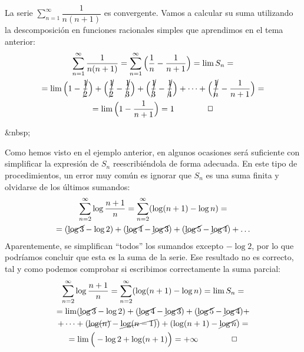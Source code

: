 \begin{ejemplo}\label{ej:telesc}
La serie $\displaystyle\sum_{n=1}^\infty   \dfrac1{n(n+1)}$ es convergente. Vamos a calcular su suma utilizando la descomposición en funciones racionales simples que aprendimos en el tema anterior:
\begin{multline*}
\displaystyle\sum_{n=1}^\infty   \dfrac1{n(n+1)} = \displaystyle\sum_{n=1}^\infty   \Big(\dfrac1n-\dfrac1{n+1}\Big) = \lim S_n = \\
= \lim
\Big(1-\cancel{\frac12}\Big) +
\Big(\cancel{\frac12}-\cancel{\frac13}\Big) +
\Big(\cancel{\frac13}-\cancel{\frac14}\Big) +
\dots + \Big(\cancel{\frac1n}-\frac1{n+1}\Big) =\\
= \lim\Big(1 -\frac1{n+1}\Big) = 1\tag*{\fej}
\end{multline*}
\end{ejemplo}
\begin{rawhtml}
&nbsp;
\end{rawhtml}
\begin{ejemplo}\label{ej:telesc2}
Como hemos visto en el ejemplo anterior, en algunos ocasiones será suficiente con simplificar la expresión de $S_n$ reescribiéndola de forma adecuada.
En este tipo de procedimientos, un error muy común es ignorar que $S_n$ es una suma finita y olvidarse de los últimos sumandos:
\begin{multline*}
\displaystyle\sum_{n=2}^\infty   \log\dfrac{n+1}{n} = \displaystyle\sum_{n=2}^\infty   (\log(n+1)-\log n) = \\
= (\cancel{\log3}-\log2)+(\cancel{\log4}-\cancel{\log3})+(\cancel{\log5}-\cancel{\log4})+\dots
\end{multline*}
Aparentemente, se simplifican ``todos'' los sumandos excepto $-\log2$, por lo que podríamos concluir que esta es la suma de la serie.
Ese resultado no es correcto, tal y como podemos comprobar si escribimos correctamente la suma parcial:
%
\begin{multline*}
\displaystyle\sum_{n=2}^\infty   \log\dfrac{n+1}{n} =
\displaystyle\sum_{n=2}^\infty   (\log(n+1)-\log n) = \lim S_n = \\
= \lim (\cancel{\log3}-\log2) + (\cancel{\log4}-\cancel{\log3})  +(\cancel{\log5}-\cancel{\log4}) + \\
 +\dots + (\cancel{\log(n)}-\cancel{\log (n-1)}) + (\log(n+1)-\cancel{\log n}) =\\
= \lim\Big(-\log 2 +\log(n+1)\Big) = +\infty\tag*{\fej}
\end{multline*}
\end{ejemplo}
